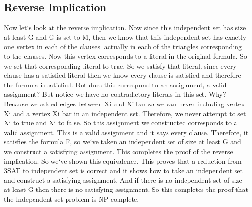 \subsection{Reverse Implication}
Now let`s look at the reverse implication.
Now since this independent set has size at least G and G is set to M, then we know that this independent set has exactly one vertex in each of the clauses, actually in each of the triangles corresponding to the clauses.
Now this vertex corresponds to a literal in the original formula.
So we set that corresponding literal to true.
So we satisfy that literal, since every clause has a satisfied literal then we know every clause is satisfied and therefore the formula is satisfied.
But does this correspond to an assignment, a valid assignment? But notice we have no contradictory literals in this set.
Why? Because we added edges between Xi and Xi bar so we can never including vertex Xi and a vertex Xi bar in an independent set.
Therefore, we never attempt to set Xi to true and Xi to false.
So this assignment we constructed corresponds to a valid assignment.
This is a valid assignment and it says every clause.
Therefore, it satisfies the formula F, so we`ve taken an independent set of size at least G and we construct a satisfying assignment.
This completes the proof of the reverse implication.
So we`ve shown this equivalence.
This proves that a reduction from 3SAT to independent set is correct and it shows how to take an independent set and construct a satisfying assignment.
And if there is no independent set of size at least G then there is no satisfying assignment.
So this completes the proof that the Independent set problem is NP-complete.

